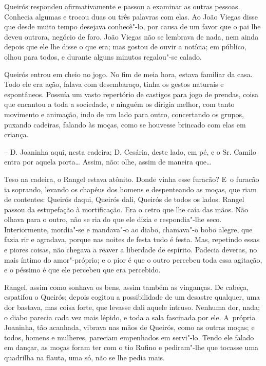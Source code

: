 Queirós respondeu afirmativamente e passou a examinar as outras pessoas.
Conhecia algumas e trocou duas ou três palavras com elas. Ao João Viegas
disse que desde muito tempo desejava conhecê"-lo, por causa de um favor
que o pai lhe deveu outrora, negócio de foro. João Viegas não se
lembrava de nada, nem ainda depois que ele lhe disse o que era; mas
gostou de ouvir a notícia; em público, olhou para todos, e durante
alguns minutos regalou"-se calado.

Queirós entrou em cheio no jogo. No fim de meia hora, estava familiar da
casa. Todo ele era ação, falava com desembaraço, tinha os gestos
naturais e espontâneos. Possuía um vasto repertório de castigos para
jogo de prendas, coisa que encantou a toda a sociedade, e ninguém os
dirigia melhor, com tanto movimento e animação, indo de um lado para
outro, concertando os grupos, puxando cadeiras, falando às moças, como
se houvesse brincado com elas em criança.

-- D. Joaninha aqui, nesta cadeira; D. Cesária, deste lado, em pé, e o
Sr. Camilo entra por aquela porta\ldots{} Assim, não: olhe, assim de maneira
que\ldots{}

Teso na cadeira, o Rangel estava atônito. Donde vinha esse furacão? E~o
furacão ia soprando, levando os chapéus dos homens e despenteando as
moças, que riam de contentes: Queirós daqui, Queirós dali, Queirós de
todos os lados. Rangel passou da estupefação à mortificação. Era o cetro
que lhe caía das mãos. Não olhava para o outro, não se ria do que ele
dizia e respondia"-lhe seco. Interiormente, mordia"-se e mandava"-o ao
diabo, chamava"-o bobo alegre, que fazia rir e agradava, porque nas
noites de festa tudo é festa. Mas, repetindo essas e piores coisas, não
chegava a reaver a liberdade de espírito. Padecia deveras, no mais
íntimo do amor"-próprio; e o pior é que o outro percebeu toda essa
agitação, e o péssimo é que ele percebeu que era percebido.

Rangel, assim como sonhava os bens, assim também as vinganças. De
cabeça, espatifou o Queirós; depois cogitou a possibilidade de um
desastre qualquer, uma dor bastava, mas coisa forte, que levasse dali
aquele intruso. Nenhuma dor, nada; o diabo parecia cada vez mais lépido,
e toda a sala fascinada por ele. A~própria Joaninha, tão acanhada,
vibrava nas mãos de Queirós, como as outras moças; e todos, homens e
mulheres, pareciam empenhados em servi"-lo. Tendo ele falado em dançar,
as moças foram ter com o tio Rufino e pediram"-lhe que tocasse uma
quadrilha na flauta, uma só, não se lhe pedia mais.

